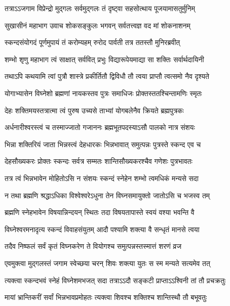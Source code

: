 \twolineshloka
{तत्राऽऽजगाम विप्रेन्द्रो मुद्गलः सर्वमुद्गलः}
{तं दृष्ट्वा सहसोत्थाय पूजयामासतुर्मुनिम्} %

\twolineshloka
{सुखासीनं महाभाग उवाच शोकसङ्कुलः}
{भगवन् सर्वतत्त्वज्ञ वद मां शोकनाशनम्} %

\twolineshloka
{स्कन्दसंयोगदं पूर्णमुपायं तं करोम्यहम्}
{रुरोद पार्वती तत्र ततस्तौ मुनिरब्रवीत्} %


\twolineshloka
{शम्भो श‍ृणु महाभाग त्वं साक्षात् सर्ववित् प्रभुः}
{विद्यारूपेयमाद्या सा शक्तिः सर्वार्थदायिनी} %

\twolineshloka
{तथाऽपि कथयामि त्वां पुत्रौ शास्त्रे प्रकीर्तितौ}
{द्विविधौ तौ त्वया प्राप्तौ त्वत्समो नैव दृश्यते} %

\twolineshloka
{योगाभ्यासेन विघ्नेशो ब्रह्मणां नायकस्तव}
{पुत्रः समाधिजः प्रोक्तस्ततश्चिन्तामणिः स्मृतः} %

\twolineshloka
{देहः शक्तिमयस्तत्रात्मा त्वं पुरुष उच्यसे}
{ताभ्यां योगबलेनैव क्रियते ब्रह्मपुत्रकः} %

\twolineshloka
{अर्धनारीश्वरस्त्वं च तस्माज्जातो गजाननः}
{ब्रह्मभूतपदस्याऽसौ पालको नात्र संशयः} %

\twolineshloka
{भिन्ना शक्तिरियं जाता भिन्नस्त्वं देहधारकः}
{भिन्नभावात् समुत्पन्नः पुत्रस्ते स्कन्द एव च} %

\twolineshloka
{देहसौख्यकरः प्रोक्तः स्कन्दः सर्वत्र सम्मतः}
{शान्तिसौख्यकरश्चैव गणेशः पुत्रभावतः} %

\twolineshloka
{तत्र त्वं भिन्नभावेन मोहितोऽसि न संशयः}
{स्कन्दं स्नेहेन शम्भो त्वमधिकं मन्यसे सदा} %

\twolineshloka
{न तथा ब्रह्मणि श्रद्धाऽधिका विश्वेश्वरेऽधुना}
{तेन विघ्नसमायुक्तो जातोऽसि च भजस्व तम्} %

\twolineshloka
{ब्रह्मणि स्नेहभावेन विषयान्निन्दयन् स्थितः}
{तदा विषयतापास्ते स्वयं वश्या भवन्ति वै} %

\twolineshloka
{विघ्नेश्वरमनादृत्य स्कन्दं विवाहसंयुतम्}
{आदौ पश्यामि शक्त्या वै सन्धृतं मानसे त्वया} %

\twolineshloka
{तदैव निष्फलं सर्वं कृतं विघ्नकरेण ते}
{वियोगश्च समुत्पन्नस्तस्मात्तं शरणं व्रज} %

\twolineshloka
{एवमुक्त्वा मुद्गलस्तं जगाम स्वेच्छया चरन्}
{शिवः शक्त्या युतः स स्म मन्यते सत्यमेव तत्} %

\twolineshloka
{त्यक्त्वा स्कन्दभवं स्नेहं विघ्नेशमभजत् सदा}
{तत्राऽऽदौ सङ्कटी प्राप्ताऽऽश्विनी तां तौ प्रचक्रतुः} %

\twolineshloka
{मायां भ्रान्तिकरीं सर्वां भिन्नभावप्रमोहतः}
{त्यक्त्वा शिवश्च शक्तिश्च शान्तिस्थौ तौ बभूवतुः} %

